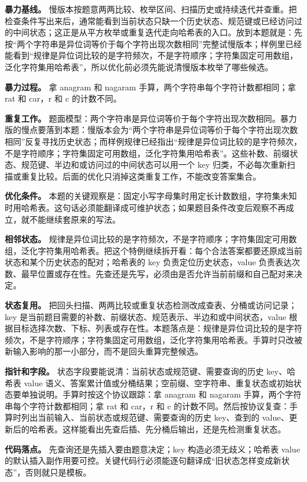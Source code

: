 \textbf{暴力基线。} 慢版本按题意两两比较、枚举区间、扫描历史或持续迭代并查重。把检查条件写出来后，通常能看到当前状态只缺一个历史状态、规范键或已经访问过的中间状态；这正是从平方枚举或重复迭代走向哈希表的入口。放到本题就是：先按“两个字符串是异位词等价于每个字符出现次数相同”完整试慢版本；样例里已经能看到“规律是异位词比较的是字符频次，不是字符顺序；字符集固定可用数组，泛化字符集用哈希表”，所以优化前必须先能说清慢版本枚举了哪些候选。

\textbf{暴力过程。} 拿 anagram 和 nagaram 手算，两个字符串每个字符计数都相同；拿 rat 和 car，r 和 c 的计数不同。

\textbf{重复工作。} 题面模型：两个字符串是异位词等价于每个字符出现次数相同。暴力版的慢点要落到本题：慢版本会为“两个字符串是异位词等价于每个字符出现次数相同”反复寻找历史状态；而样例规律已经指出“规律是异位词比较的是字符频次，不是字符顺序；字符集固定可用数组，泛化字符集用哈希表”。这些补数、前缀状态、规范键、半边和或访问过的中间状态可以用一个 key 归类，不必每次重新扫描或重复比较。后面的优化只消掉这类重复工作，不能改变答案集合。

\textbf{优化条件。} 本题的关键观察是：固定小写字母集时用定长计数数组，字符集未知时用哈希表。这句话必须能翻译成可维护状态；如果题目条件改变后观察不再成立，就不能继续套原来的写法。

\textbf{相邻状态。} 规律是异位词比较的是字符频次，不是字符顺序；字符集固定可用数组，泛化字符集用哈希表。把这个特例继续拆开看：每个合法答案都要还原成当前状态和某个历史状态的配对；哈希表的 key 负责定位历史状态，value 负责表达次数、最早位置或存在性。先查还是先写，必须由是否允许当前前缀和自己配对来决定。

\textbf{状态复用。} 把回头扫描、两两比较或重复状态检测改成查表、分桶或访问记录；key 是当前题目需要的补数、前缀状态、规范表示、半边和或中间状态，value 根据目标选择次数、下标、列表或存在性。本题落点是：规律是异位词比较的是字符频次，不是字符顺序；字符集固定可用数组，泛化字符集用哈希表。手算时只改被新输入影响的那一小部分，而不是回头重算完整候选。

\textbf{指针和字段。} 状态字段要能说清：当前状态或规范键、需要查询的历史 key、哈希表 value 语义、答案累计值或分桶结果；空前缀、空字符串、重复状态或初始状态要单独说明。手算时按这个协议跟踪：拿 anagram 和 nagaram 手算，两个字符串每个字符计数都相同；拿 rat 和 car，r 和 c 的计数不同。然后按协议复查：手算时列出当前输入、当前状态或规范键、需要查询的历史 key、查到的 value、更新后的哈希表。这样能看出先查后插、先分桶后输出，还是先检测重复状态。

\textbf{代码落点。} 先查询还是先插入要由题意决定；key 构造必须无歧义；哈希表 value 的默认插入副作用要可控。关键代码行必须能逐句翻译成“旧状态怎样变成新状态”，否则就只是模板。

